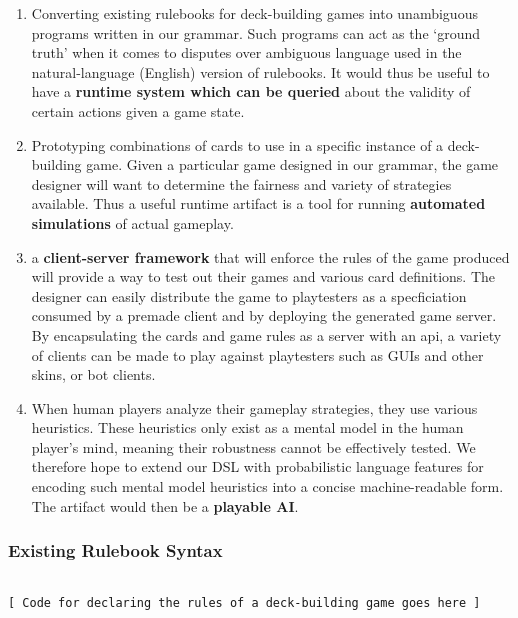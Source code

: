 \documentclass{acm_proc_article-sp}
\begin{document}
\begin{enumerate}
\item Converting existing rulebooks for deck-building games into unambiguous programs written in
our grammar. Such programs can act as the `ground truth' when it comes to disputes over ambiguous
language used in the natural-language (English) version of rulebooks. It would thus be useful to
have a {\bf runtime system which can be queried} about the validity of certain actions given a game state.

\item Prototyping combinations of cards to use in a specific instance of a deck-building game.
Given a particular game designed in our grammar, the game designer will want to determine the
fairness and variety of strategies available. Thus a useful runtime artifact is a tool for
running {\bf automated simulations} of actual gameplay.

\item a {\bf client-server framework} that will enforce the rules of the game produced will provide a way to test out their games and various card definitions. The designer can easily distribute the game to playtesters as a specficiation consumed by a premade client and by deploying the generated game server. By encapsulating the cards and game rules as a server with an api, a variety of clients can be made to play against playtesters such as GUIs and other skins, or bot clients.

\item When human players analyze their gameplay strategies, they use various heuristics.
These heuristics only exist as a mental model in the human player's mind, meaning their
robustness cannot be effectively tested. We therefore hope to extend our DSL with probabilistic
language features for encoding such mental model heuristics into a concise machine-readable form.
The artifact would then be a {\bf playable AI}.

\end{enumerate}

\subsubsection{Existing Rulebook Syntax}
\begin{verbatim}

[ Code for declaring the rules of a deck-building game goes here ]
\end{verbatim}
\end{document}
